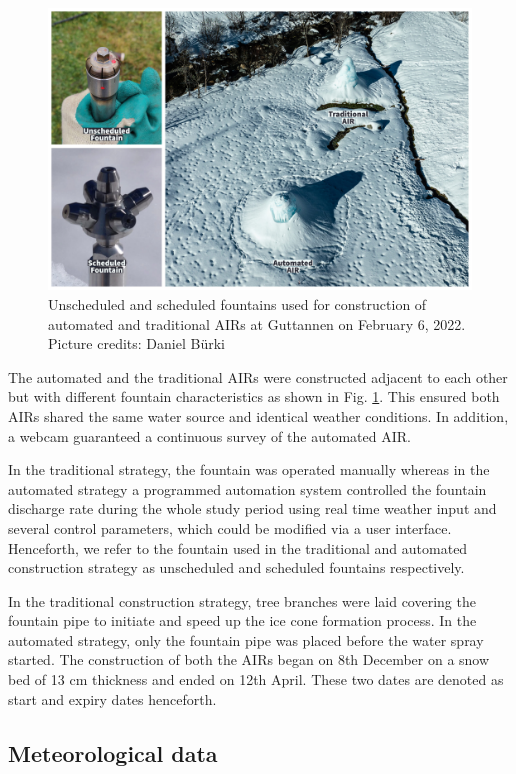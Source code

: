 \documentclass[tc, manuscript]{copernicus}
\begin{document}
\begin{figure}[t]
\includegraphics[width=12cm]{Figures/AIR_fountains.jpg}
\caption{Unscheduled and scheduled fountains used for construction of automated and traditional AIRs at Guttannen on February 6, 2022. Picture credits: Daniel Bürki}
\label{fig:2AIR}
\end{figure}

The automated and the traditional AIRs were constructed adjacent to each other but with different fountain
characteristics as shown in Fig. \ref{fig:2AIR}. This ensured both AIRs shared the same water source and
identical weather conditions. In addition, a webcam guaranteed a continuous survey of the automated AIR.   

In the traditional strategy, the fountain was operated manually whereas in the automated strategy a programmed
automation system controlled the fountain discharge rate during the whole study period using real time weather
input and several control parameters, which could be modified via a user interface. Henceforth, we refer to the
fountain used in the traditional and automated construction strategy as unscheduled and scheduled fountains
respectively.

In the traditional construction strategy, tree branches were laid covering the fountain pipe to initiate and
speed up the ice cone formation process. In the automated strategy, only the fountain pipe was placed before the
water spray started. The construction of both the AIRs began on 8th December on a snow bed of 13 cm thickness
and ended on 12th April. These two dates are denoted as start and expiry dates henceforth.

\subsection{Meteorological data}
\end{document}
